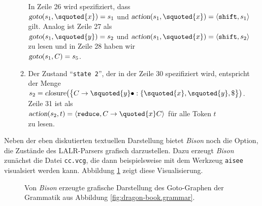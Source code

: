 \begin{enumerate}
\begin{enumerate}
            In Zeile 26 wird  spezifiziert, dass
            \\[0.2cm]
            \hspace*{1.3cm} 
            $\textsl{goto}(s_1, \squoted{x}) = s_1$ \quad und \quad
            $\textsl{action}(s_1, \squoted{x}) =\langle \texttt{shift}, s_1 \rangle$
            \\[0.2cm]
            gilt.  Analog ist Zeile 27 als
            \\[0.2cm]
            \hspace*{1.3cm} 
            $\textsl{goto}(s_1, \squoted{y}) = s_2$ \quad und \quad
            $\textsl{action}(s_1, \squoted{x}) = \langle \texttt{shift}, s_2 \rangle$
            \\[0.2cm]
            zu lesen und in Zeile 28 haben wir
            \\[0.2cm]
            \hspace*{1.3cm}
            $\textsl{goto}(s_1,C) = s_5$.
      \item Der Zustand ``\texttt{state 2}'', der in der Zeile 30 spezifiziert
            wird, entspricht der Menge
            \\[0.2cm]
            \hspace*{1.3cm}
            $s_2 = \textsl{closure}\bigl(\bigl\{ C \rightarrow \squoted{y} \bullet:  \{
            \squoted{x}, \squoted{y},\symbol{36} \bigr\}\bigr)$.
            \\[0.2cm]
            Zeile 31 ist als
            \\[0.2cm]
            \hspace*{1.3cm}
            $\textsl{action}(s_2,t) = \langle \texttt{reduce}, C \rightarrow \quoted{x} C \rangle$ 
            \quad f\"ur alle Token $t$
            \\[0.2cm]
            zu lesen.
      \end{enumerate}
\end{enumerate}
Neben der eben diskutierten textuellen Darstellung bietet \textsl{Bison} noch die Option, die Zust\"ande des
LALR-Parsers grafisch darzustellen.  Dazu erzeugt \textsl{Bison} zun\"achst die Datei \texttt{cc.vcg}, die dann
beispielsweise mit dem Werkzeug \texttt{aisee} visualsiert werden kann.  Abbildung
\ref{fig:bison-goto-graph.eps} zeigt diese Visualisierung. 

\begin{figure}[!ht]
\centering
  \caption{Von \textsl{Bison} erzeugte grafische Darstellung des Goto-Graphen der Grammatik aus Abbildung \ref{fig:dragon-book.grammar}.}
  \label{fig:bison-goto-graph.eps}
\end{figure}
\pagebreak

